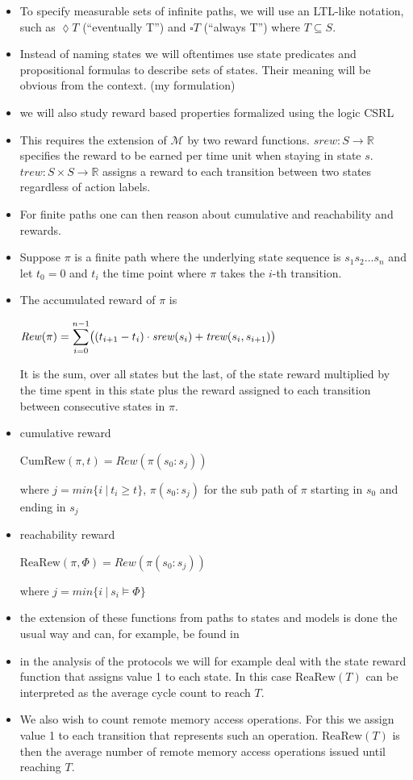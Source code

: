 \documentclass[a4paper, 10pt]{article}
\begin{document}
\begin{itemize}
	\item To specify measurable sets of infinite paths, we will use an LTL-like notation, such as $\lozenge T$ (``eventually T'') and $\square T$ (``always T'') where $T \subseteq S$.
	\item Instead of naming states we will oftentimes use state predicates and propositional formulas to describe sets of states. Their meaning will be obvious from the context. (my formulation)
	\item we will also study reward based properties formalized using the logic CSRL \cite{bhhk00, knp07}
	\item This requires the extension of $\mathcal{M}$ by two reward functions. $\mathit{srew} : S \rightarrow \mathbb{R}$ specifies the reward to be earned per time  unit when staying in state $s$. $\mathit{trew} : S \times S \rightarrow \mathbb{R}$ assigns a reward to each transition between two states regardless of action labels.
	\item For finite paths one can then reason about cumulative and reachability and rewards.
	\item Suppose $\pi$ is a finite path where the underlying state sequence is $s_1 s_2 ...s_n$ and let $t_0 = 0$ and $t_i$ the time point where $\pi$ takes the $i$-th transition.
	\item The accumulated reward of $\pi$ is
		\begin{center}
			$\mathit{Rew}(\pi) = \mathlarger{\sum}\limits_{i=0}^{n-1} \big( (t_{i+1} - t_i) \cdot \mathit{srew}(s_i) + \mathit{trew}(s_i, s_{i+1}) \big)$
		\end{center}
		It is the sum, over all states but the last, of the state reward multiplied by the time spent in this state plus the reward assigned to each transition between consecutive states in $\pi$.
	\item cumulative reward
		\begin{center}
			$\mathrm{CumRew}(\pi, t) = \mathit{Rew}(\pi(s_0:s_j))$
		\end{center}
		where $j = min \{ i~|~t_i \ge t \}$, $\pi(s_0:s_j)$ for the sub path of $\pi$ starting in $s_0$ and ending in $s_j$
	\item reachability reward
		\begin{center}
			$\mathrm{ReaRew}(\pi, \Phi) = \mathit{Rew}(\pi(s_0:s_j))$
		\end{center}
		where $j = min \{ i~|~s_i \models \Phi \}$
	\item the extension of these functions from paths to states and models is done the usual way and can, for example, be found in \cite{bhhk03}
	\item in the analysis of the protocols we will for example deal with the state reward function that assigns value 1 to each state. In this case $\mathrm{ReaRew}(T)$ can be interpreted as the average cycle count to reach $T$.
	\item We also wish to count remote memory access operations. For this we assign value 1 to each transition that represents such an operation. $\mathrm{ReaRew}(T)$ is then the average number of remote memory access operations issued until reaching $T$.
\end{itemize}
\end{document}
